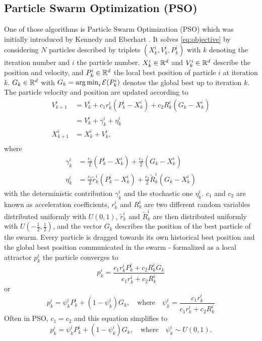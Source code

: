 \documentclass[a4paper, 11pt]{article}
\begin{document}
\subsection{Particle Swarm Optimization (PSO)}
One of those algorithms is Particle Swarm Optimization (PSO) which was initially introduced by Kennedy and Eberhart \cite{kennedy1995particle}. It solves \eqref{eq:objective} by considering $N$ particles described by triplets $(X^i_{k}, V^i_{k}, P^i_{k})$ with $k$ denoting the iteration number and $i$ the particle number. $X^i_{k}\in\mathbb{R}^d$ and $V^i_{k}\in\mathbb{R}^d$ describe the position and velocity, and $P^i_{k}\in\mathbb{R}^d$ the local best position of particle $i$ at iteration $k$. $G_k\in\mathbb{R}^d$ with $G_{k}=\operatorname*{\arg\min}_i {\cal E}(P^i_{k})$ denotes the global best up to iteration $k$. The particle velocity and position are updated according to
\begin{align}
    V^i_{k+1} & = V^i_{k} + c_1 r^i_{k} (P^i_{k} - X^i_{k}) + c_2 R^i_{k} (G_{k} - X^i_{k}) \\
              & = V^i_{k} + \gamma^i_{k} + \eta^i_{k} \nonumber                             \\
    X^i_{k+1} & = X^i_{k} + V^i_{k} ,                                                       \\
    \nonumber
\end{align}
where
\begin{align}
    \gamma^i_{k} & =\frac{c_1}{2} (P^i_{k} - X^i_{k}) + \frac{c_2}{2} (G_{k} - X^i_{k}) \nonumber                               \\
    \eta^i_{k}   & = \frac{c_1}{2} \tilde r^i_{k} (P^i_{k} - X^i_{k}) + \frac{c_2}{2} \tilde R^i_{k} (G_{k} - X^i_{k})\nonumber
\end{align}
with the deterministic contribution $\gamma^i_{k}$ and the stochastic one $\eta^i_{k}$. $c_1$ and $c_2$ are known as acceleration coefficients, $r^i_{k}$ and $R^i_{k}$ are two different random variables distributed uniformly with $U(0,1)$, $\tilde r^i_{k}$ and $\tilde R^i_{k}$ are then distributed uniformly with $U(-\frac{1}{2},\frac{1}{2})$, and the vector $G_{k}$ describes the position of the best particle of the swarm. Every particle is dragged towards its own historical best position and the global best position communicated in the swarm - formalized as a local attractor $p^i_{k}$ the particle converges to
\begin{equation*}
    p^i_{k} = \frac{c_1 r^i_{k}P^i_{k} + c_2 R^i_{k} G_{k}}{c_1 r^i_{k} + c_2 R^i_{k}}
\end{equation*}
or
\begin{equation*}
    p^i_{k} = \psi^i_{k}P^i_{k} + (1-\psi^i_{k})G_{k}, \quad \text{where} \quad \psi^i_{k} = \frac{c_1 r^i_{k}}{c_1 r^i_{k} + c_2 R^i_{k}}
\end{equation*}
Often in PSO, $c_1=c_2$ and this equation simplifies to
\begin{equation}\label{pso:localattractor}
    p^i_{k} = \psi^i_{k}P^i_{k} + (1-\psi^i_{k})G_{k}, \quad \text{where} \quad \psi^i_{k} \sim U(0,1).
\end{equation}
\end{document}
